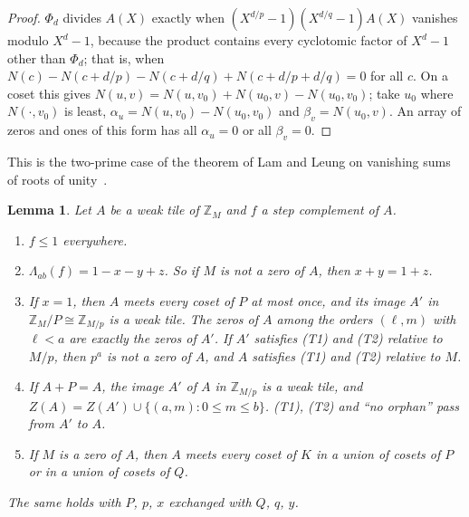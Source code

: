 \documentclass[11pt,a4paper]{amsart}
\newtheorem{lemma}[theorem]{Lemma}
\theoremstyle{definition}
\theoremstyle{remark}
\newcommand{\Z}{\mathbb{Z}}
\begin{document}
\begin{proof}
$\Phi_d$ divides $A(X)$ exactly when $(X^{d/p}-1)(X^{d/q}-1)A(X)$ vanishes modulo $X^d-1$, because the product
contains every cyclotomic factor of $X^d-1$ other than $\Phi_d$; that is, when
$N(c)-N(c+d/p)-N(c+d/q)+N(c+d/p+d/q)=0$ for all $c$. On a coset this gives
$N(u,v)=N(u,v_0)+N(u_0,v)-N(u_0,v_0)$; take $u_0$ where $N(\cdot,v_0)$ is least,
$\alpha_u=N(u,v_0)-N(u_0,v_0)$ and $\beta_v=N(u_0,v)$. An array of zeros and ones of this form has all
$\alpha_u=0$ or all $\beta_v=0$.
\end{proof}

This is the two-prime case of the theorem of Lam and Leung on vanishing sums of roots of unity~\cite{LL}.

\begin{lemma}\label{lem:E}
Let $A$ be a weak tile of $\Z_M$ and $f$ a step complement of $A$.
\begin{enumerate}
\item $f\le1$ everywhere.
\item $\Lambda_{ab}(f)=1-x-y+z$. So if $M$ is not a zero of $A$, then $x+y=1+z$.
\item If $x=1$, then $A$ meets every coset of $P$ at most once, and its image $A'$ in $\Z_M/P\cong\Z_{M/p}$ is
a weak tile. The zeros of $A$ among the orders $(\ell,m)$ with $\ell<a$ are exactly the zeros of $A'$. If $A'$
satisfies \textup{(T1)} and \textup{(T2)} relative to $M/p$, then $p^a$ is not a zero of $A$, and $A$ satisfies
\textup{(T1)} and \textup{(T2)} relative to $M$.
\item If $A+P=A$, the image $A'$ of $A$ in $\Z_{M/p}$ is a weak tile, and
$Z(A)=Z(A')\cup\{(a,m):0\le m\le b\}$. \textup{(T1)}, \textup{(T2)} and ``no orphan'' pass from $A'$ to $A$.
\item If $M$ is a zero of $A$, then $A$ meets every coset of $K$ in a union of cosets of $P$ or in a union of
cosets of $Q$.
\end{enumerate}
The same holds with $P$, $p$, $x$ exchanged with $Q$, $q$, $y$.
\end{lemma}
\end{document}
